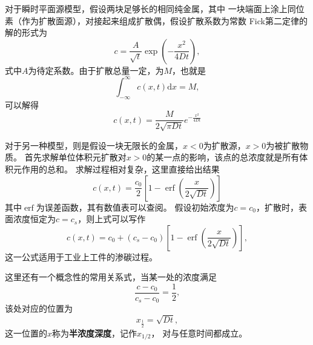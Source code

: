                 对于瞬时平面源模型，假设两块足够长的相同纯金属，其中
                一块端面上涂上同位素（作为扩散面源），对接起来组成扩散偶，假设扩散系数为常数
                Fick第二定律的解的形式为
                \begin{equation}
                    c=\frac{A}{\sqrt{t}} \exp \left(-\frac{x^{2}}{4 D t}\right),
                \end{equation}
                式中$A$为待定系数。由于扩散总量一定，为$M$，也就是
                \begin{equation}
                    \int_{-\infty}^{\infty} c(x, t) \mathrm{d} x=M,
                \end{equation}
                可以解得
                \begin{equation}
                    c(x, t)=\frac{M}{2 \sqrt{\pi D t}} e^{-\frac{x^{2}}{4 D t}}
                \end{equation}

                对于另一种模型，则是假设一块无限长的金属，$x<0$为扩散源，$x>0$为被扩散物质。
                首先求解单位体积元扩散对$x>0$的某一点的影响，该点的总浓度就是所有体积元作用的总和。
                求解过程相对复杂，这里直接给出结果
                \begin{equation}
                    c(x, t)=\frac{c_{0}}{2}\left[1-\operatorname{erf}\left(\frac{x}{2 \sqrt{D t}}\right)\right]
                \end{equation}
                其中$\operatorname{erf}$为误差函数，其有数值表可以查阅。
                假设初始浓度为$c=c_0$，扩散时，表面浓度恒定为$c=c_s$，则上式可以写作
                \begin{equation}
                    c(x,t)=c_0+(c_s-c_0)\left[ 1-\operatorname{erf}\left( \frac{x}{2\sqrt{Dt}} \right) \right],
                \end{equation}
                这一公式适用于工业上工件的渗碳过程。

                这里还有一个概念性的常用关系式，当某一处的浓度满足
                \begin{equation}
                    \frac{c-c_{0}}{c_{s}-c_{0}}=\frac{1}{2},
                \end{equation}
                该处对应的位置为
                \begin{equation}
                    x_{\frac{1}{2}}=\sqrt{Dt},
                \end{equation}
                这一位置的$x$称为\textbf{半浓度深度}，记作$x_{1/2}$，
                对与任意时间都成立。

